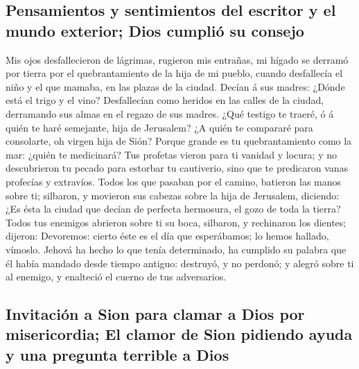 \hypertarget{pensamientos-y-sentimientos-del-escritor-y-el-mundo-exterior-dios-cumpliuxf3-su-consejo}{%
\subsection{Pensamientos y sentimientos del escritor y el mundo
exterior; Dios cumplió su
consejo}\label{pensamientos-y-sentimientos-del-escritor-y-el-mundo-exterior-dios-cumpliuxf3-su-consejo}}

 Mis ojos desfallecieron de lágrimas, rugieron mis
entrañas, mi hígado se derramó por tierra por el quebrantamiento de la
hija de mi pueblo, cuando desfallecía el niño y el que mamaba, en las
plazas de la ciudad.  Decían á sus madres: ¿Dónde está el
trigo y el vino? Desfallecían como heridos en las calles de la ciudad,
derramando sus almas en el regazo de sus madres.  ¿Qué
testigo te traeré, ó á quién te haré semejante, hija de Jerusalem? ¿A
quién te compararé para consolarte, oh virgen hija de Sión? Porque
grande es tu quebrantamiento como la mar: ¿quién te medicinará?
 Tus profetas vieron para ti vanidad y locura; y no
descubrieron tu pecado para estorbar tu cautiverio, sino que te
predicaron vanas profecías y extravíos.  Todos los que
pasaban por el camino, batieron las manos sobre ti; silbaron, y movieron
sus cabezas sobre la hija de Jerusalem, diciendo: ¿Es ésta la ciudad que
decían de perfecta hermosura, el gozo de toda la tierra? 
Todos tus enemigos abrieron sobre ti su boca, silbaron, y rechinaron los
dientes; dijeron: Devoremos: cierto éste es el día que esperábamos; lo
hemos hallado, vímoslo.  Jehová ha hecho lo que tenía
determinado, ha cumplido su palabra que él había mandado desde tiempo
antiguo: destruyó, y no perdonó; y alegró sobre ti al enemigo, y
enalteció el cuerno de tus adversarios.

\hypertarget{invitaciuxf3n-a-sion-para-clamar-a-dios-por-misericordia-el-clamor-de-sion-pidiendo-ayuda-y-una-pregunta-terrible-a-dios}{%
\subsection{Invitación a Sion para clamar a Dios por misericordia; El
clamor de Sion pidiendo ayuda y una pregunta terrible a
Dios}\label{invitaciuxf3n-a-sion-para-clamar-a-dios-por-misericordia-el-clamor-de-sion-pidiendo-ayuda-y-una-pregunta-terrible-a-dios}}

